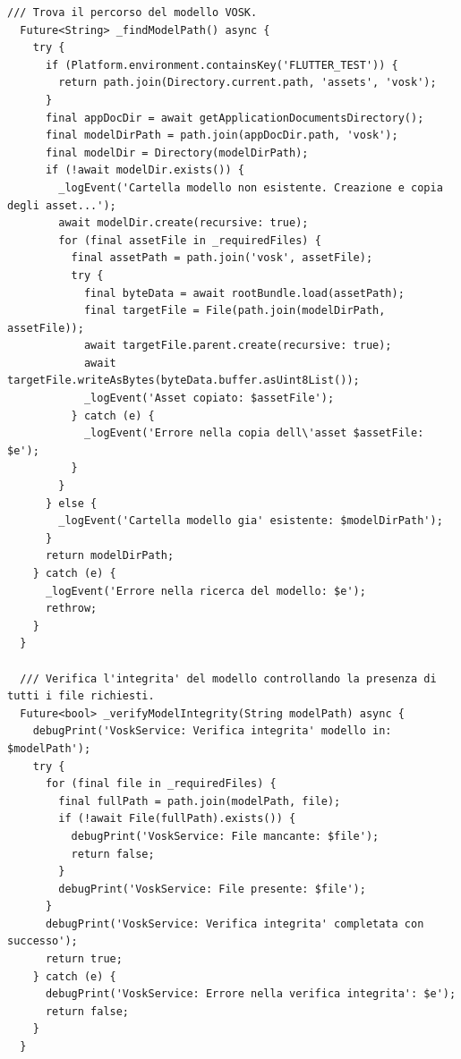 \documentclass[14pt]{extbook}
\begin{document}
\begin{lstlisting}[caption=vosk\_service.dart, label=lst:VoskService]
  /// Trova il percorso del modello VOSK.
  Future<String> _findModelPath() async {
    try {
      if (Platform.environment.containsKey('FLUTTER_TEST')) {
        return path.join(Directory.current.path, 'assets', 'vosk');
      }
      final appDocDir = await getApplicationDocumentsDirectory();
      final modelDirPath = path.join(appDocDir.path, 'vosk');
      final modelDir = Directory(modelDirPath);
      if (!await modelDir.exists()) {
        _logEvent('Cartella modello non esistente. Creazione e copia degli asset...');
        await modelDir.create(recursive: true);
        for (final assetFile in _requiredFiles) {
          final assetPath = path.join('vosk', assetFile);
          try {
            final byteData = await rootBundle.load(assetPath);
            final targetFile = File(path.join(modelDirPath, assetFile));
            await targetFile.parent.create(recursive: true);
            await targetFile.writeAsBytes(byteData.buffer.asUint8List());
            _logEvent('Asset copiato: $assetFile');
          } catch (e) {
            _logEvent('Errore nella copia dell\'asset $assetFile: $e');
          }
        }
      } else {
        _logEvent('Cartella modello gia' esistente: $modelDirPath');
      }
      return modelDirPath;
    } catch (e) {
      _logEvent('Errore nella ricerca del modello: $e');
      rethrow;
    }
  }

  /// Verifica l'integrita' del modello controllando la presenza di tutti i file richiesti.
  Future<bool> _verifyModelIntegrity(String modelPath) async {
    debugPrint('VoskService: Verifica integrita' modello in: $modelPath');
    try {
      for (final file in _requiredFiles) {
        final fullPath = path.join(modelPath, file);
        if (!await File(fullPath).exists()) {
          debugPrint('VoskService: File mancante: $file');
          return false;
        }
        debugPrint('VoskService: File presente: $file');
      }
      debugPrint('VoskService: Verifica integrita' completata con successo');
      return true;
    } catch (e) {
      debugPrint('VoskService: Errore nella verifica integrita': $e');
      return false;
    }
  }


\end{lstlisting}
\end{document}

